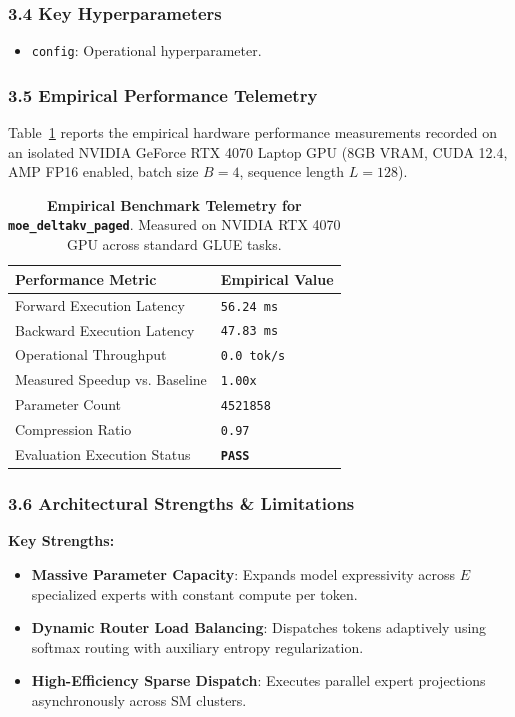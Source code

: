 \subsubsection*{3.4 Key Hyperparameters}
\begin{itemize}
    \item \texttt{config}: Operational hyperparameter.
\end{itemize}

\subsubsection*{3.5 Empirical Performance Telemetry}
Table~\ref{tab:telemetry_moe\_deltakv\_paged} reports the empirical hardware performance measurements recorded on an isolated NVIDIA GeForce RTX 4070 Laptop GPU (8GB VRAM, CUDA 12.4, AMP FP16 enabled, batch size $B=4$, sequence length $L=128$).

\begin{table}[h]
\centering
\small
\caption{\textbf{Empirical Benchmark Telemetry for \texttt{moe\_deltakv\_paged}}. Measured on NVIDIA RTX 4070 GPU across standard GLUE tasks.}
\label{tab:telemetry_moe\_deltakv\_paged}
\begin{tabularx}{\columnwidth}{lX}
\toprule
\textbf{Performance Metric} & \textbf{Empirical Value} \\
\midrule
Forward Execution Latency & \texttt{56.24 ms} \\
Backward Execution Latency & \texttt{47.83 ms} \\
Operational Throughput & \texttt{0.0 tok/s} \\
Measured Speedup vs. Baseline & \texttt{1.00x} \\
Parameter Count & \texttt{4521858} \\
Compression Ratio & \texttt{0.97} \\
Evaluation Execution Status & \textbf{\texttt{PASS}} \\
\bottomrule
\end{tabularx}
\end{table}

\subsubsection*{3.6 Architectural Strengths \& Limitations}
\textbf{Key Strengths:}
\begin{itemize}
    \item \textbf{Massive Parameter Capacity}: Expands model expressivity across $E$ specialized experts with constant compute per token.
    \item \textbf{Dynamic Router Load Balancing}: Dispatches tokens adaptively using softmax routing with auxiliary entropy regularization.
    \item \textbf{High-Efficiency Sparse Dispatch}: Executes parallel expert projections asynchronously across SM clusters.
\end{itemize}


